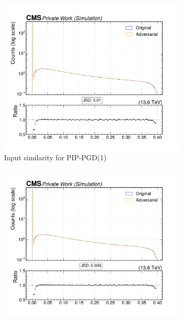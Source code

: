\begin{figure}[htbp]
  \centering
  \begin{subfigure}[t]{0.32\textwidth}
    \includegraphics[width=\linewidth]{media/output/features/compare/combined_it_1/cmp_cpf_arr_Cpfcan_BtagPf_trackDeltaR.pdf}
    \caption*{Input similarity for PIP-PGD(1)}
  \end{subfigure}\hfill
  \begin{subfigure}[t]{0.32\textwidth}
    \includegraphics[width=\linewidth]{media/output/features/compare/combined_it_2/cmp_cpf_arr_Cpfcan_BtagPf_trackDeltaR.pdf}

\end{subfigure}
\end{figure}
